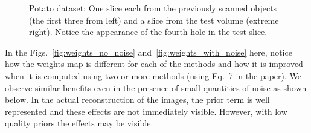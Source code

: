 \documentclass{article}
\begin{document}
\begin{figure}[!h]
\begin{subfigure}[b]{0.235\linewidth}
\captionsetup{labelformat=empty}
        \caption{}
\label{fig:potato_test}
     \end{subfigure}
      \caption{Potato dataset: One slice each from the previously scanned objects (the first three from left) and a slice from the test 
        volume (extreme right). Notice the appearance of the fourth
        hole in the test slice. }
\label{fig:object-prior_test_potato_A1}
\end{figure}
In the Figs.~\ref{fig:weights_no_noise} and~\ref{fig:weights_with_noise} here, notice how the weights map is different for each of the methods and how it is improved when it is computed using two or more methods (using Eq.~7 in the paper). We observe similar benefits even in the presence of small quantities of noise as shown below. In the actual reconstruction of the images, the prior term is well represented and these effects are not immediately visible.  However, with low quality priors the effects may be visible.
\end{document}
